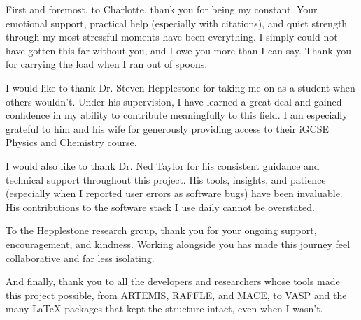 First and foremost, to Charlotte, thank you for being my constant. Your emotional support, practical help (especially with citations), and quiet strength through my most stressful moments have been everything. I simply could not have gotten this far without you, and I owe you more than I can say. Thank you for carrying the load when I ran out of spoons.

I would like to thank Dr. Steven Hepplestone for taking me on as a student when others wouldn't. Under his supervision, I have learned a great deal and gained confidence in my ability to contribute meaningfully to this field. I am especially grateful to him and his wife for generously providing access to their iGCSE Physics and Chemistry course.

I would also like to thank Dr. Ned Taylor for his consistent guidance and technical support throughout this project. His tools, insights, and patience (especially when I reported user errors as software bugs) have been invaluable. His contributions to the software stack I use daily cannot be overstated.

To the Hepplestone research group, thank you for your ongoing support, encouragement, and kindness. Working alongside you has made this journey feel collaborative and far less isolating.

And finally, thank you to all the developers and researchers whose tools made this project possible, from ARTEMIS, RAFFLE, and MACE, to VASP and the many LaTeX packages that kept the structure intact, even when I wasn't.
